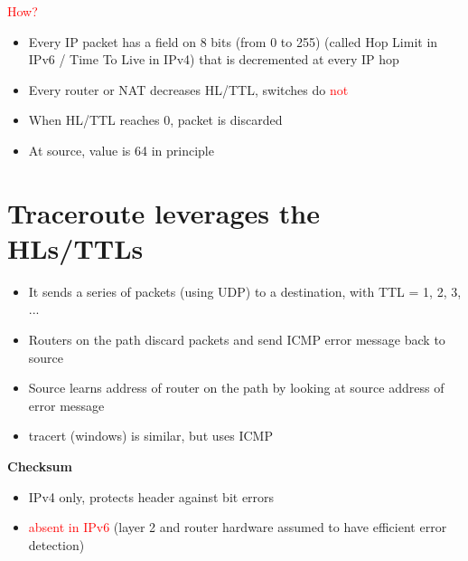 \documentclass[11pt]{article}
\begin{document}
\textcolor{red}{How?}
\begin{itemize}
	\item Every IP packet has a field on 8 bits (from 0 to 255) (called Hop Limit in IPv6 / Time To Live in IPv4) that is decremented at every IP hop
	\item Every router or NAT decreases HL/TTL, switches do \textcolor{red}{not}
	\item When HL/TTL reaches 0, packet is discarded
	\item At source, value is 64 in principle
\end{itemize}

\section*{Traceroute leverages the HLs/TTLs}

\begin{itemize}
	\item It sends a series of packets (using UDP) to a destination, with TTL = 1, 2, 3, ...
	\item Routers on the path discard packets and send ICMP error message back to source
	\item Source learns address of router on the path by looking at source address of error message
	\item tracert (windows) is similar, but uses ICMP
\end{itemize}

\textbf{Checksum}

\begin{itemize}
	\item IPv4 only, protects header against bit errors
	\item \textcolor{red}{absent in IPv6} (layer 2 and router hardware assumed to have efficient error detection)
\end{itemize}
\end{document}
